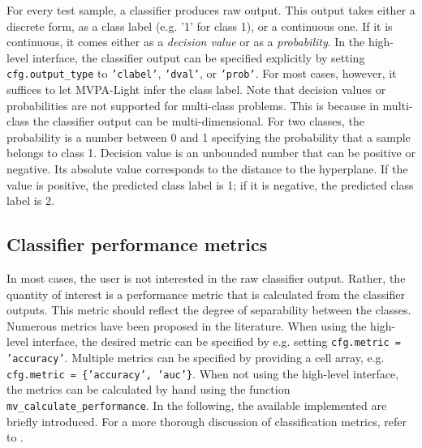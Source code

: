 \documentclass[utf8]{frontiersSCNS} %
\newcommand{\ttt}[1]{\texttt{#1}}
\begin{document}
For every test sample, a classifier produces raw output. This output takes either a discrete form, as a class label (e.g. '1' for class 1), or a continuous one. If it is continuous, it comes either as a \textit{decision value} or as a \textit{probability}.
In the high-level interface, the classifier output can be specified explicitly by setting \ttt{cfg.output\_type} to \ttt{'clabel'}, \ttt{'dval'}, or \ttt{'prob'}. For most cases, however, it suffices to let MVPA-Light infer the class label. Note that decision values or probabilities are not supported for multi-class problems. This is because in multi-class the classifier output can be multi-dimensional. For two classes, the probability is a number between 0 and 1 specifying the probability that a sample belongs to class 1. Decision value is an unbounded number that can be positive or negative. Its absolute value corresponds to the distance to the hyperplane.
 If the value is positive, the predicted class label is 1; if it is negative, the predicted class label is 2.

\subsection{Classifier performance metrics}\label{sec:metrics}

In most cases, the user is not interested in the raw classifier output. Rather, the quantity of interest is a performance metric that is calculated from the classifier outputs.
This metric should reflect the degree of separability between the classes. Numerous metrics have been proposed in the literature.  When using the high-level interface, the desired metric can be specified by e.g. setting \ttt{cfg.metric = 'accuracy'}. Multiple metrics can be specified by providing a cell array, e.g. \ttt{cfg.metric = \{'accuracy', 'auc'\}}. When not using the high-level interface, the metrics can be calculated by hand using the function \ttt{mv\_calculate\_performance}. In the following, the available implemented are briefly introduced. For a more thorough discussion of classification metrics, refer to  \cite{Sokolova2009ATasks}.
\end{document}
